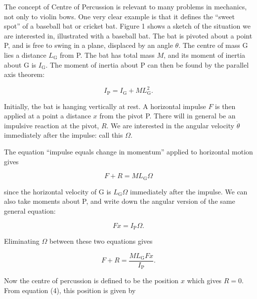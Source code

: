   The concept of Centre of Percussion is relevant to many problems in 
  mechanics, not only to violin bows. One very clear example is that it defines 
  the ``sweet spot'' of a baseball bat or cricket bat. Figure 1 shows a sketch 
  of the situation we are interested in, illustrated with a baseball bat. The 
  bat is pivoted about a point P, and is free to swing in a plane, displaced by 
  an angle $\theta$. The centre of mass G lies a distance $L_{\mathrm{G}}$ from 
  P. The bat has total mass $M$, and its moment of inertia about G is 
  $I_{\mathrm{G}}$. The moment of inertia about P can then be found by the 
  parallel axis theorem: 

  \begin{equation*}I_{\mathrm{P}}=I_{\mathrm{G}}+ML_{\mathrm{G}}^2. 
  \tag{1}\end{equation*} 


  Initially, the bat is hanging vertically at rest. A horizontal impulse $F$ is 
  then applied at a point a distance $x$ from the pivot P. There will in 
  general be an impulsive reaction at the pivot, $R$. We are interested in the 
  angular velocity $\dot{\theta}$ immediately after the impulse: call this 
  $\Omega$. 

  The equation ``impulse equals change in momentum'' applied to horizontal 
  motion gives 

  \begin{equation*}F+R=M L_{\mathrm{G}} \Omega \tag{2}\end{equation*} 

  \noindent{}since the horizontal velocity of G is $L_{\mathrm{G}} \Omega$ 
  immediately after the impulse. We can also take moments about P, and write 
  down the angular version of the same general equation: 

  \begin{equation*}Fx=I_{\mathrm{P}} \Omega . \tag{3}\end{equation*} 

  Eliminating $\Omega$ between these two equations gives 

  \begin{equation*} F+R=\frac{ML_{\mathrm{G}}Fx}{I_{\mathrm{P}}} . 
  \tag{4}\end{equation*} 

  Now the centre of percussion is defined to be the position $x$ which gives 
  $R=0$. From equation (4), this position is given by 

